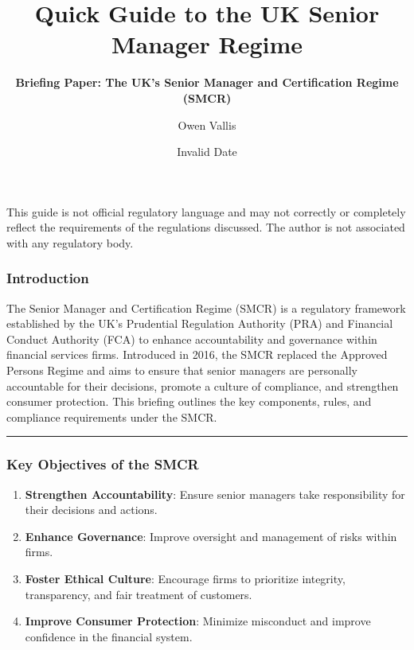 \documentclass[
  a4paper,
]{article}
\title{Quick Guide to the UK Senior Manager Regime}
\subtitle{\textbf{Briefing Paper: The UK's Senior Manager and
Certification Regime (SMCR)}}
\author{Owen Vallis}
\date{Invalid Date}
\providecommand{\tightlist}{%
  \setlength{\itemsep}{0pt}\setlength{\parskip}{0pt}}\usepackage{longtable,booktabs,array}
\renewcommand*\contentsname{Table of contents}
\newcommand\contentsname{Table of contents}
\begin{document}
\maketitle

\renewcommand*\contentsname{Contents}
{
\hypersetup{linkcolor=}
\setcounter{tocdepth}{2}
\tableofcontents
}

\begin{tcolorbox}[enhanced jigsaw, breakable, colframe=quarto-callout-warning-color-frame, title=\textcolor{quarto-callout-warning-color}{\faExclamationTriangle}\hspace{0.5em}{WARNING - Disclaimer}, colback=white, coltitle=black, bottomtitle=1mm, rightrule=.15mm, opacityback=0, toptitle=1mm, titlerule=0mm, arc=.35mm, left=2mm, opacitybacktitle=0.6, bottomrule=.15mm, colbacktitle=quarto-callout-warning-color!10!white, toprule=.15mm, leftrule=.75mm]

This guide is not official regulatory language and may not correctly or
completely reflect the requirements of the regulations discussed. The
author is not associated with any regulatory body.

\end{tcolorbox}

\subsubsection{Introduction}\label{introduction}

The Senior Manager and Certification Regime (SMCR) is a regulatory
framework established by the UK's Prudential Regulation Authority (PRA)
and Financial Conduct Authority (FCA) to enhance accountability and
governance within financial services firms. Introduced in 2016, the SMCR
replaced the Approved Persons Regime and aims to ensure that senior
managers are personally accountable for their decisions, promote a
culture of compliance, and strengthen consumer protection. This briefing
outlines the key components, rules, and compliance requirements under
the SMCR.

\begin{center}\rule{0.5\linewidth}{0.5pt}\end{center}

\subsubsection{Key Objectives of the
SMCR}\label{key-objectives-of-the-smcr}

\begin{enumerate}
\def\labelenumi{\arabic{enumi}.}
\tightlist
\item
  \textbf{Strengthen Accountability}: Ensure senior managers take
  responsibility for their decisions and actions.
\item
  \textbf{Enhance Governance}: Improve oversight and management of risks
  within firms.
\item
  \textbf{Foster Ethical Culture}: Encourage firms to prioritize
  integrity, transparency, and fair treatment of customers.
\item
  \textbf{Improve Consumer Protection}: Minimize misconduct and improve
  confidence in the financial system.
\end{enumerate}
\end{document}
